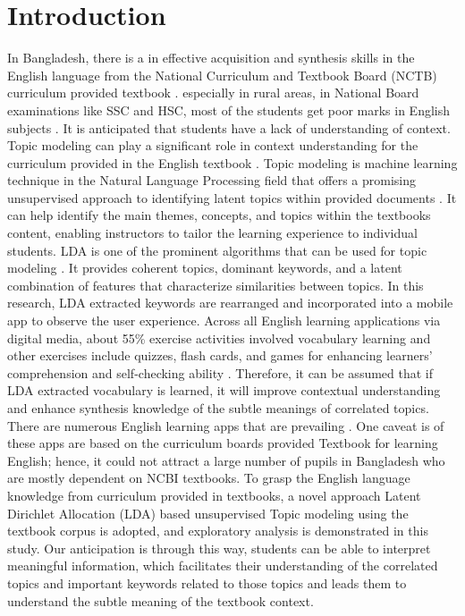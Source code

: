 \documentclass[sn-mathphys,Numbered]{sn-jnl}%
\theoremstyle{thmstyleone}%
\theoremstyle{thmstyletwo}%
\theoremstyle{thmstylethree}%
\begin{document}
\section{Introduction}\label{sec1}
In Bangladesh, there is a in effective acquisition and synthesis skills in the English language from the National Curriculum and Textbook Board (NCTB) curriculum provided textbook \cite{report_schools_2018, statistics_bangladesh_2017}. especially in rural areas, in National Board examinations like SSC and HSC, most of the students get poor marks in English subjects \cite{noauthor_bangladesh_2021, habib_english_2018}. It is anticipated that students have a lack of understanding of context. Topic modeling can play a significant role in context understanding for the curriculum provided in the English textbook \cite{qiang2020short, bethard_topic_2009, ali_transportation_2019, slater_using_2017, guerra_when_2013}. Topic modeling is machine learning technique in the Natural Language Processing field that offers a promising unsupervised approach to identifying latent topics within provided documents \cite{jelodar_latent_2019, gupta_pan_lda_2021, pichardo_lagunas_svd_lda_2015, selvi_classification_2019, pichardo_lagunas_svd_lda_2015_1}. It can help identify the main themes, concepts, and topics within the textbook\textquotesingle s content, enabling instructors to tailor the learning experience to individual students. LDA is one of the prominent algorithms that can be used for topic modeling \cite{blei2003latent}. It provides coherent topics, dominant keywords, and a latent combination of features that characterize similarities between topics. In this research, LDA extracted keywords are rearranged and incorporated into a mobile app to observe the user experience. Across all English learning applications via digital media, about 55\% exercise activities involved vocabulary learning \cite{klimova_evaluation_2018, hao_evaluative_2019, polakova_mobile_2019} and other exercises include quizzes, flash cards, and games \cite{xu_scoping_2020, shortt_gamification_2023} for enhancing learners' comprehension and self-checking ability \cite{bernacki_mobile_2020, metruk_use_2021, isamiddinovna_mobile_2019, klimova_evaluation_2018}. Therefore, it can be assumed that if LDA extracted vocabulary is learned, it will improve contextual understanding and enhance synthesis knowledge of the subtle meanings of correlated topics. There are numerous English learning apps that are prevailing \cite{metruk_use_2021, rafiq_sustaining_2021, chen_evaluating_2016}. One caveat is of these apps are based on the curriculum boards provided Textbook for learning English; hence, it could not attract a large number of pupils in Bangladesh who are mostly dependent on NCBI textbooks. To grasp the English language knowledge from curriculum provided in textbooks, a novel approach Latent Dirichlet Allocation (LDA) based unsupervised Topic modeling using the textbook corpus is adopted, and exploratory analysis is demonstrated in this study. Our anticipation is through this way, students can be able to interpret meaningful information, which facilitates their understanding of the correlated topics and important keywords related to those topics and leads them to understand the subtle meaning of the textbook context.
\end{document}
